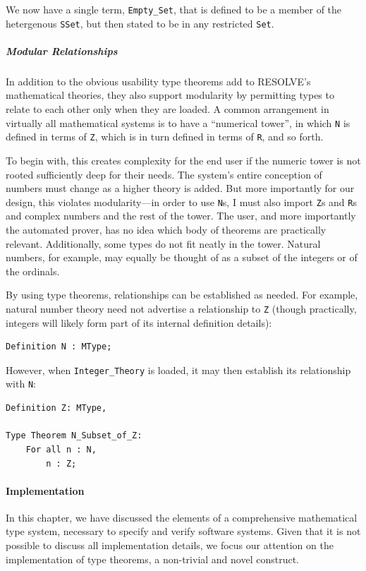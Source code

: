 We now have a single term, \texttt{Empty\_Set}, that is defined to be a member of the hetergenous \texttt{SSet}, but then stated to be in any restricted \texttt{Set}.

\subparagraph{Modular Relationships}
In addition to the obvious usability type theorems add to RESOLVE's mathematical theories, they also support modularity by permitting types to relate to each other only when they are loaded.  A common arrangement in virtually all mathematical systems is to have a ``numerical tower'', in which \texttt{N} is defined in terms of \texttt{Z}, which is in turn defined in terms of \texttt{R}, and so forth.

To begin with, this creates complexity for the end user if the numeric tower is not rooted sufficiently deep for their needs.  The system's entire conception of numbers must change as a higher theory is added.  But more importantly for our design, this violates modularity---in order to use \texttt{N}s, I must also import \texttt{Z}s and \texttt{R}s and complex numbers and the rest of the tower.  The user, and more importantly the automated prover, has no idea which body of theorems are practically relevant.  Additionally, some types do not fit neatly in the tower.  Natural numbers, for example, may equally be thought of as a subset of the integers or of the ordinals.

By using type theorems, relationships can be established as needed.  For example, natural number theory need not advertise a relationship to \texttt{Z} (though practically, integers will likely form part of its internal definition details):

\begin{lstlisting}
Definition N : MType;
\end{lstlisting}

However, when \texttt{Integer\_Theory} is loaded, it may then establish its relationship with \texttt{N}:

\begin{lstlisting}
Definition Z: MType,

Type Theorem N_Subset_of_Z:
	For all n : N,
		n : Z;
\end{lstlisting}

\paragraph{Implementation\label{typeTheoremImplementation}}

In this chapter, we have discussed the elements of a comprehensive mathematical type system, necessary to specify and verify software systems.  Given that it is not possible to discuss all implementation details, we focus our attention on the implementation of type theorems, a non-trivial and novel construct.

